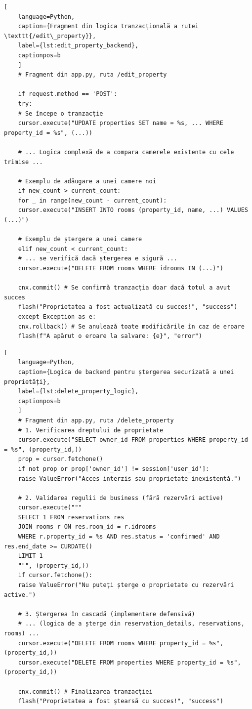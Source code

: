 \documentclass[12pt, a4paper, oneside, romanian]{teza-upb}
\begin{document}
\begin{lstlisting}[
	language=Python,
	caption={Fragment din logica tranzacțională a rutei \texttt{/edit\_property}},
	label={lst:edit_property_backend},
	captionpos=b
	]
	# Fragment din app.py, ruta /edit_property
	
	if request.method == 'POST':
	try:
	# Se începe o tranzacție
	cursor.execute("UPDATE properties SET name = %s, ... WHERE property_id = %s", (...))
	
	# ... Logica complexă de a compara camerele existente cu cele trimise ...
	
	# Exemplu de adăugare a unei camere noi
	if new_count > current_count:
	for _ in range(new_count - current_count):
	cursor.execute("INSERT INTO rooms (property_id, name, ...) VALUES (...)")
	
	# Exemplu de ștergere a unei camere
	elif new_count < current_count:
	# ... se verifică dacă ștergerea e sigură ...
	cursor.execute("DELETE FROM rooms WHERE idrooms IN (...)")
	
	cnx.commit() # Se confirmă tranzacția doar dacă totul a avut succes
	flash("Proprietatea a fost actualizată cu succes!", "success")
	except Exception as e:
	cnx.rollback() # Se anulează toate modificările în caz de eroare
	flash(f"A apărut o eroare la salvare: {e}", "error")
\end{lstlisting}

\begin{lstlisting}[
	language=Python,
	caption={Logica de backend pentru ștergerea securizată a unei proprietăți},
	label={lst:delete_property_logic},
	captionpos=b
	]
	# Fragment din app.py, ruta /delete_property
	# 1. Verificarea dreptului de proprietate
	cursor.execute("SELECT owner_id FROM properties WHERE property_id = %s", (property_id,))
	prop = cursor.fetchone()
	if not prop or prop['owner_id'] != session['user_id']:
	raise ValueError("Acces interzis sau proprietate inexistentă.")
	
	# 2. Validarea regulii de business (fără rezervări active)
	cursor.execute("""
	SELECT 1 FROM reservations res 
	JOIN rooms r ON res.room_id = r.idrooms 
	WHERE r.property_id = %s AND res.status = 'confirmed' AND res.end_date >= CURDATE() 
	LIMIT 1
	""", (property_id,))
	if cursor.fetchone():
	raise ValueError("Nu puteți șterge o proprietate cu rezervări active.")
	
	# 3. Ștergerea în cascadă (implementare defensivă)
	# ... (logica de a șterge din reservation_details, reservations, rooms) ...
	cursor.execute("DELETE FROM rooms WHERE property_id = %s", (property_id,))
	cursor.execute("DELETE FROM properties WHERE property_id = %s", (property_id,))
	
	cnx.commit() # Finalizarea tranzacției
	flash("Proprietatea a fost ștearsă cu succes!", "success")
	
\end{lstlisting}
\end{document}

